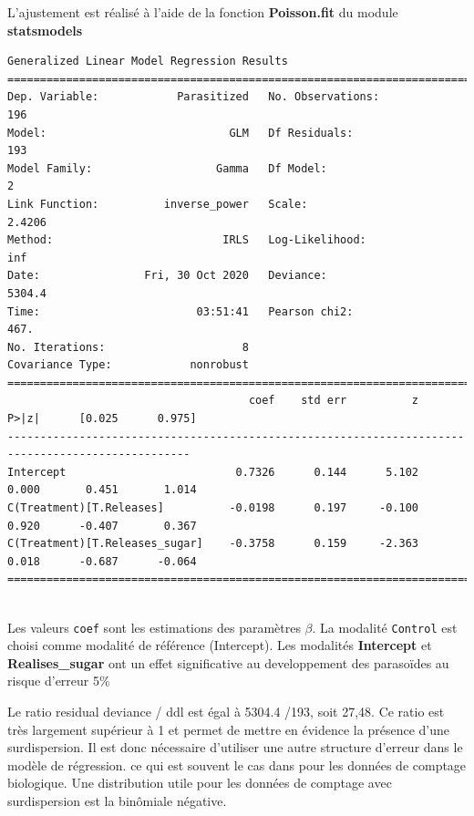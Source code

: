 \documentclass[12pt]{article}
\begin{document}
L’ajustement est réalisé à l’aide de la fonction \textbf{Poisson.fit} du module \textbf{statsmodels}


\begin{lstlisting}[caption=Python-output from fitting a GLM to count data]
                 Generalized Linear Model Regression Results                  
==============================================================================
Dep. Variable:            Parasitized   No. Observations:                  196
Model:                            GLM   Df Residuals:                      193
Model Family:                   Gamma   Df Model:                            2
Link Function:          inverse_power   Scale:                          2.4206
Method:                          IRLS   Log-Likelihood:                    inf
Date:                Fri, 30 Oct 2020   Deviance:                       5304.4
Time:                        03:51:41   Pearson chi2:                     467.
No. Iterations:                     8                                         
Covariance Type:            nonrobust                                         
==================================================================================================
                                     coef    std err          z      P>|z|      [0.025      0.975]
--------------------------------------------------------------------------------------------------
Intercept                          0.7326      0.144      5.102      0.000       0.451       1.014
C(Treatment)[T.Releases]          -0.0198      0.197     -0.100      0.920      -0.407       0.367
C(Treatment)[T.Releases_sugar]    -0.3758      0.159     -2.363      0.018      -0.687      -0.064
==================================================================================================
 
 \end{lstlisting}

Les valeurs \texttt{coef} sont les estimations des paramètres $\beta$. La modalité \texttt{Control} est choisi comme modalité de référence (Intercept).
Les modalités \textbf{Intercept} et \textbf{Realises\_sugar} ont un effet significative au developpement des parasoïdes au risque d'erreur 5\%
 
 
 Le ratio residual deviance / ddl est égal à 5304.4 /193, soit 27,48. Ce ratio est très largement supérieur à 1 et permet de mettre en évidence la présence d’une surdispersion. Il est donc nécessaire d’utiliser une autre structure d’erreur dans le modèle de régression. ce qui est souvent le cas dans pour les données de comptage biologique. Une distribution utile pour les données de comptage avec surdispersion est la binômiale négative.
 
\end{document}

